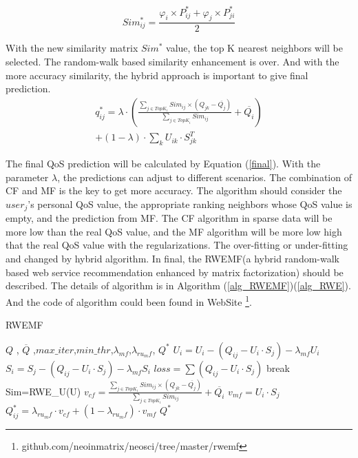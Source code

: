 \documentclass[conference]{IEEEtran}
\begin{document}
\begin{equation}\label{eqsime} 
Sim_{ij}^{*}=\frac
{
\varphi_{i} \times P^{*}_{ij} + \varphi_{j} \times P^{*}_{ji}
}{2}
\end{equation}
\par With the new similarity matrix $Sim^{*}$ value, the top K nearest neighbors will be selected. The random-walk based similarity enhancement is over. And with the more accuracy similarity, the hybrid approach is important to give final prediction.
\begin{equation}
\begin{aligned}
q_{ij}^{*}= \lambda \cdot (
\frac{
  \sum_{j \in TopK_{i}}{Sim_{ij} \times (Q_{jk}-\overline{Q_{j}})}
}{\sum_{j \in TopK_{i}}{Sim_{ij}}
}+\overline{Q_{i}}
) \\ + (1-\lambda) \cdot \sum_{k}U_{ik} \cdot S_{jk}^{T}
\label{final}
\end{aligned}
\end{equation}
\par The final QoS prediction will be calculated by Equation (\ref{final}). With the parameter $\lambda$, the predictions can adjust to different scenarios. The combination of CF and MF is the key to get more accuracy. The algorithm should consider the $user_{j}$'s personal QoS value, the appropriate ranking neighbors whose QoS value is empty, and the prediction from MF. The CF algorithm in sparse data will be more low than the real QoS value, and the MF algorithm will be more low high that the real QoS value with the regularizations. The over-fitting or under-fitting and changed by hybrid algorithm. In final, the RWEMF(a hybrid random-walk based web service recommendation enhanced by matrix factorization) should be described. The details of algorithm is in Algorithm (\ref{alg_RWEMF})(\ref{alg_RWE}). And the code of algorithm could been found in WebSite \footnote{github.com/neoinmatrix/neosci/tree/master/rwemf}.
\begin{algorithm}  
\caption{RWEMF}  
\label{alg_RWEMF}  
\begin{algorithmic}
\REQUIRE $Q$ , $\overline{Q}$ ,$max\_iter$,$min\_thr$,$\lambda_{mf}$,$\lambda_{ru_mf}$,
\ENSURE $Q^{*}$
    \STATE $U_{i} =U_{i}-(Q_{ij}-U_{i} \cdot S_{j}) -\lambda_{mf} U_{i}$
    \STATE $S_{i} =S_{j}-(Q_{ij}-U_{i} \cdot S_{j}) -\lambda_{mf} S_{i}$
    \STATE $loss=\sum{(Q_{ij}-U_{i} \cdot S_{j})}$
        \STATE break
    \ENDIF 
\ENDFOR
\STATE Sim=RWE\_U(U)
        \STATE $v_{cf}=\frac{
  \sum_{j \in TopK_{i}}{Sim_{ij} \times (Q_{jk}-\overline{Q_{j}})}
  }{
  \sum_{j \in TopK_{i}}{Sim_{ij}}
}+\overline{Q_{i}} $    
        \STATE $v_{mf}= U_{i} \cdot S_{j}$
        \STATE $Q_{ij}^{*}= \lambda_{ru_mf} \cdot v_{cf} + (1-\lambda_{ru_mf}) \cdot v_{mf}$
    \ENDFOR
\ENDFOR
\RETURN $Q^{*}$
\end{algorithmic}  
\end{algorithm}  
\end{document}
